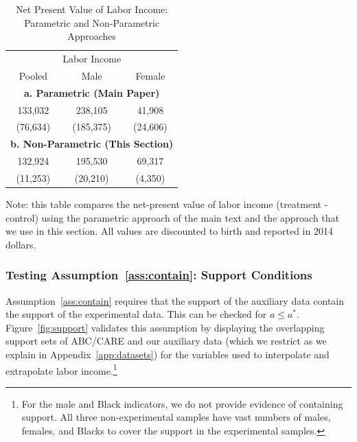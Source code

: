 \begin{table}[H]
\begin{threeparttable}
\caption{Net Present Value of Labor Income: Parametric and Non-Parametric Approaches}
\label{table:nvpli}
\centering
\begin{tabular}{ccc} \toprule
\multicolumn{3}{c}{Labor Income} \\
Pooled & Male & Female \\ \midrule
\multicolumn{3}{c}{\textbf{a. Parametric (Main Paper)}} \\
133,032 & 238,105 & 41,908 \\
(76,634) & (185,375) & (24,606) \\
\multicolumn{3}{c}{\textbf{b. Non-Parametric (This Section)}} \\
132,924 & 195,530 & 69,317 \\
(11,253) & (20,210) & (4,350) \\ \bottomrule
\end{tabular}
\begin{tablenotes}
\footnotesize
\item Note: this table compares the net-present value of labor income (treatment - control) using the parametric approach of the main text and the approach that we use in this section. All values are discounted to birth and reported in 2014 dollars.
\end{tablenotes}
\end{threeparttable}
\end{table}

\subsubsection{Testing Assumption~\ref{ass:contain}: Support Conditions}\label{app:containsupport}

Assumption~\ref{ass:contain} requires that the support of the auxiliary data contain the support of the experimental data. This can be checked for $a \leq a^\ast$. Figure~\ref{fig:support} validates this assumption by displaying the overlapping support sets of ABC/CARE and our auxiliary data (which we restrict as we explain in Appendix~\ref{app:datasets}) for the variables used to interpolate and extrapolate labor income.\footnote{For the male and Black indicators, we do not provide evidence of containing support. All three non-experimental samples have vast numbers of males, females, and Blacks to cover the support in the experimental samples.}


